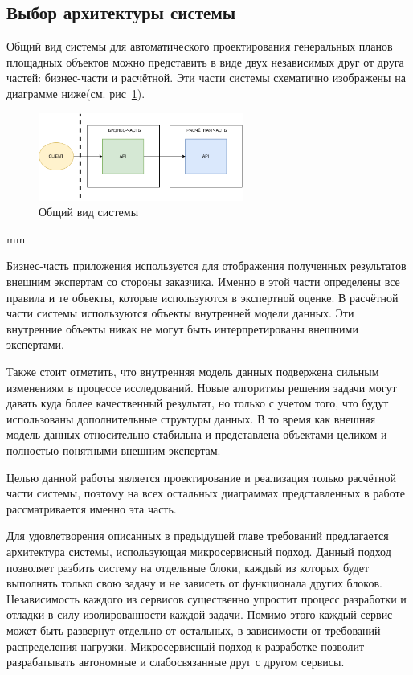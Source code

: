 \subsection{\large{Выбор архитектуры системы}}

Общий вид системы для автоматического проектирования генеральных планов площадных объектов можно представить в виде
двух независимых друг от друга частей: бизнес-части и расчётной.
Эти части системы схематично изображены на диаграмме ниже(см. рис\ \ref{pic:architecture__system-diagram}).

\begin{figure}[H]
	\hspace*{-2.5 cm}\includegraphics[width=0.6\textwidth, left]{architecture/pictures/common/system}
	\caption{Общий вид системы}
	\label{pic:architecture__system-diagram}
\end{figure}
 mm

Бизнес-часть приложения используется для отображения полученных результатов внешним экспертам со стороны заказчика.
Именно в этой части определены все правила и те объекты, которые используются в экспертной оценке.
В расчётной части системы используются объекты внутренней модели данных.
Эти внутренние объекты никак не могут быть интерпретированы внешними экспертами.

Также стоит отметить, что внутренняя модель данных подвержена сильным изменениям в процессе исследований.
Новые алгоритмы решения задачи могут давать куда более качественный результат, но только с учетом того, что
будут использованы дополнительные структуры данных. В то время как внешняя модель данных относительно стабильна
и представлена объектами целиком и полностью понятными внешним экспертам.

Целью данной работы является проектирование и реализация только расчётной части системы, поэтому на всех остальных
диаграммах представленных в работе рассматривается именно эта часть.

Для удовлетворения описанных в предыдущей главе требований предлагается архитектура системы,
использующая микросервисный подход. Данный подход позволяет разбить систему на отдельные блоки,
каждый из которых будет выполнять только свою задачу и не зависеть от функционала других блоков.
Независимость каждого из сервисов существенно упростит процесс разработки и отладки в силу изолированности
каждой задачи. Помимо этого каждый сервис может быть развернут отдельно от остальных, в зависимости
от требований распределения нагрузки. Микросервисный подход к разработке позволит разрабатывать
автономные и слабосвязанные друг с другом сервисы.

